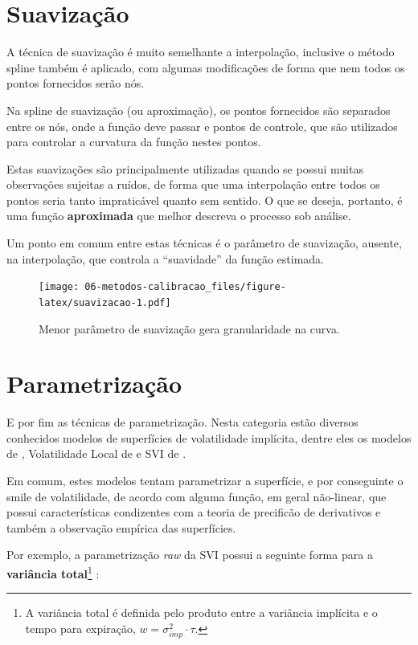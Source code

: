 \documentclass[]{book}
\let\rmarkdownfootnote\footnote%
\def\footnote{\protect\rmarkdownfootnote}
\begin{document}
\section{Suavização}\label{suavizacao}

A técnica de suavização é muito semelhante a interpolação, inclusive o
método spline também é aplicado, com algumas modificações de forma que
nem todos os pontos fornecidos serão nós.

Na spline de suavização (ou aproximação), os pontos fornecidos são
separados entre os nós, onde a função deve passar e pontos de controle,
que são utilizados para controlar a curvatura da função nestes pontos.

Estas suavizações são principalmente utilizadas quando se possui muitas
observações sujeitas a ruídos, de forma que uma interpolação entre todos
os pontos seria tanto impraticável quanto sem sentido. O que se deseja,
portanto, é uma função \textbf{aproximada} que melhor descreva o
processo sob análise.

Um ponto em comum entre estas técnicas é o parâmetro de suavização,
ausente, na interpolação, que controla a ``suavidade'' da função
estimada.

\begin{figure}
\centering
\texttt{[image: 06-metodos-calibracao\_files/figure-latex/suavizacao-1.pdf]}
\caption{\label{fig:suavizacao}Menor parâmetro de suavização gera
granularidade na curva.}
\end{figure}

\section{Parametrização}\label{parametrizacao}

E por fim as técnicas de parametrização. Nesta categoria estão diversos
conhecidos modelos de superfícies de volatilidade implícita, dentre eles
os modelos de \citet{Heston1993}, Volatilidade Local de
\citet{Dupire1994} e SVI de \citet{Gatheral2004}.

Em comum, estes modelos tentam parametrizar a superfície, e por
conseguinte o smile de volatilidade, de acordo com alguma função, em
geral não-linear, que possui características condizentes com a teoria de
precificão de derivativos e também a observação empírica das
superfícies.

Por exemplo, a parametrização \emph{raw} da SVI possui a seguinte forma
para a \textbf{variância total}\footnote{A variância total é definida
  pelo produto entre a variância implícita e o tempo para expiração,
  \(w=\sigma^2_{imp}\cdot\tau\).} :
\end{document}
